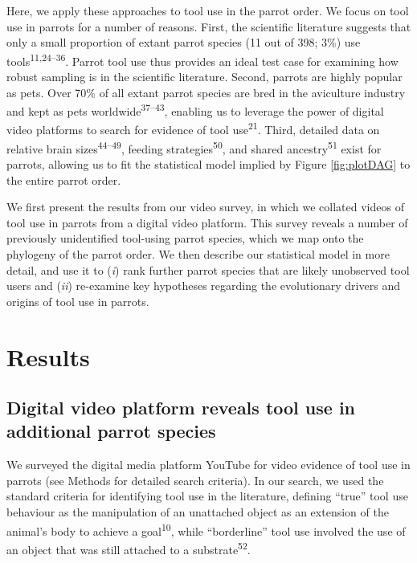 \documentclass[
  man, donotrepeattitle,floatsintext]{apa6}
\begin{document}
Here, we apply these approaches to tool use in the parrot order. We focus on
tool use in parrots for a number of reasons. First, the scientific literature
suggests that only a small proportion of extant parrot species (11 out of 398;
3\%) use tools\textsuperscript{11,24--36}. Parrot tool
use thus provides an ideal test case for examining how robust sampling is in the
scientific literature. Second, parrots are highly popular as pets. Over 70\% of
all extant parrot species are bred in the aviculture industry and kept as pets
worldwide\textsuperscript{37--43}, enabling us to leverage the power of digital video platforms to
search for evidence of tool use\textsuperscript{21}. Third, detailed data on relative
brain sizes\textsuperscript{44--49}, feeding strategies\textsuperscript{50}, and shared ancestry\textsuperscript{51} exist for parrots, allowing us to fit the statistical model implied
by Figure \ref{fig:plotDAG} to the entire parrot order.

We first present the results from our video survey, in which we collated videos
of tool use in parrots from a digital video platform. This survey reveals a
number of previously unidentified tool-using parrot species, which we map onto
the phylogeny of the parrot order. We then describe our statistical model in
more detail, and use it to (\emph{i}) rank further parrot species that are likely
unobserved tool users and (\emph{ii}) re-examine key hypotheses regarding the
evolutionary drivers and origins of tool use in parrots.

\hypertarget{results}{%
\section{Results}\label{results}}

\hypertarget{digital-video-platform-reveals-tool-use-in-additional-parrot-species}{%
\subsection{Digital video platform reveals tool use in additional parrot species}\label{digital-video-platform-reveals-tool-use-in-additional-parrot-species}}

We surveyed the digital media platform YouTube for video evidence of tool use in
parrots (see Methods for detailed search criteria). In our search, we used the
standard criteria for identifying tool use in the literature, defining ``true''
tool use behaviour as the manipulation of an unattached object as an extension
of the animal's body to achieve a goal\textsuperscript{10}, while ``borderline'' tool
use involved the use of an object that was still attached to a substrate\textsuperscript{52}.
\end{document}
